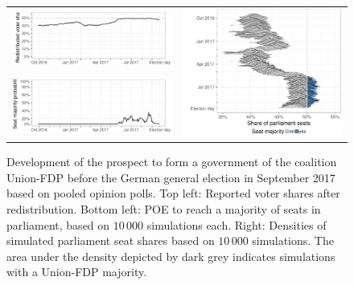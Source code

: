 \documentclass[smallcondensed]{svjour3}     %
\begin{document}
\begin{figure}[H]\centering
\begin{tabular}{ll}
\includegraphics[height=.15\textwidth]{figures/2017_pooled_cdufdp_rawSharesRedist.pdf}
&
\multirow{2}{*}[13ex]{\includegraphics[height=30ex]{figures/2017_pooled_cdufdp_ridgeline.pdf}}
\\
\includegraphics[height=.15\textwidth]{figures/2017_pooled_cdufdp_prob.pdf}
\end{tabular}
\caption{Development of the prospect to form a government of the coalition
Union-FDP before the German general election in September 2017 based on pooled
opinion polls.
Top left: Reported voter shares after redistribution.
Bottom left: POE to reach a majority of seats in parliament, based on
$10\,000$ simulations each.
Right: Densities of simulated parliament seat shares based on $10\,000$ simulations.
The area under the density depicted by dark grey indicates simulations with a
Union-FDP majority.
\label{fig:2017_cdufdp}
}
\end{figure}

\end{document}
